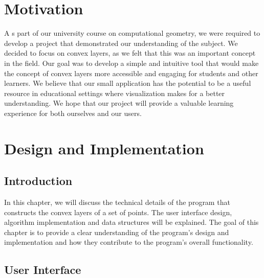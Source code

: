 \documentclass{article}
\begin{document}
\section{Motivation}
A
s part of our university course on computational geometry, we were required to develop a project that demonstrated our understanding of the subject. We decided to focus on convex layers, as we felt that this was an important concept in the field. 
\newline
\newline
Our goal was to develop a simple and intuitive tool that would make the concept of convex layers more accessible and engaging for students and other learners. We believe that our small application has the potential to be a useful resource in educational settings where visualization makes for a better understanding. We hope that our project will provide a valuable learning experience for both ourselves and our users.

\section{Design and Implementation}

\subsection{Introduction}

In this chapter, we will discuss the technical details of the program that constructs the convex layers of a set of points. The user interface design, algorithm implementation and data structures will be explained. The goal of this chapter is to provide a clear understanding of the program's design and implementation and how they contribute to the program's overall functionality.

\subsection{User Interface}
\end{document}
